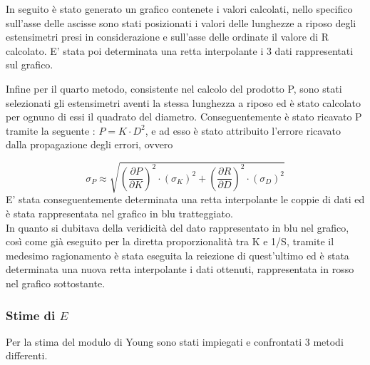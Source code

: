 \documentclass[a4paper,11pt,oneside]{article}
\begin{document}
In seguito è stato generato un grafico contenete i valori calcolati, nello specifico sull'asse delle ascisse sono stati posizionati i valori delle lunghezze a riposo degli estensimetri presi in considerazione e sull'asse delle ordinate il valore di R calcolato. E' stata poi determinata una retta interpolante i 3 dati rappresentati sul grafico.


\begin{figure}[h!]
    \centering
\end{figure}
Infine per il quarto metodo, consistente nel calcolo del prodotto P, sono stati selezionati gli estensimetri aventi la stessa lunghezza a riposo ed è stato calcolato per ognuno di essi il quadrato del diametro. Conseguentemente è stato ricavato P tramite la seguente : $P= K \cdot D^2 $, e ad esso è stato attribuito l'errore  ricavato dalla propagazione degli errori, ovvero 

\begin{equation*}
    \sigma_P \approx \sqrt{\left ( \frac{\partial P }{\partial K} \right )^2 \cdot \left ( \sigma_K \right )^2 + \left ( \frac{\partial R }{\partial D} \right )^2 \cdot \left ( \sigma_D \right )^2 }
\end{equation*}
E' stata conseguentemente determinata una retta interpolante le coppie di dati ed è stata rappresentata nel grafico in blu tratteggiato.\\
In quanto si dubitava della veridicità del dato rappresentato in blu nel grafico, così come già eseguito per la diretta proporzionalità tra K e 1/S, tramite il medesimo ragionamento è stata eseguita la reiezione di quest'ultimo ed è stata determinata una nuova retta interpolante i dati ottenuti, rappresentata in rosso nel grafico sottostante.

\begin{figure}[h!]
    \centering
\end{figure}

\subsubsection*{Stime di $E$}
Per la stima del modulo di Young sono stati impiegati e confrontati 3 metodi differenti.
\end{document}
